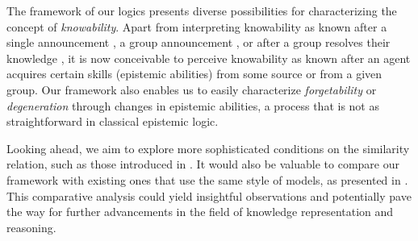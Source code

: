 \documentclass{article}
\begin{document}
The framework of our logics presents diverse possibilities for characterizing the concept of \emph{knowability}. Apart from interpreting knowability as known after a single announcement \cite{BBvDHHdL2008}, a group announcement \cite{ABDS2010}, or after a group resolves their knowledge \cite{AW2017rdk}, it is now conceivable to perceive knowability as known after an agent acquires certain skills (epistemic abilities) from some source or from a given group. Our framework also enables us to easily characterize \emph{forgetability} or \emph{degeneration} through changes in epistemic abilities, a process that is not as straightforward in classical epistemic logic.

Looking ahead, we aim to explore more sophisticated conditions on the similarity relation, such as those introduced in \cite{CMZ2009}. It would also be valuable to compare our framework with existing ones that use the same style of models, as presented in \cite{NT2015,DLW2021}. This comparative analysis could yield insightful observations and potentially pave the way for further advancements in the field of knowledge representation and reasoning.




\end{document}
